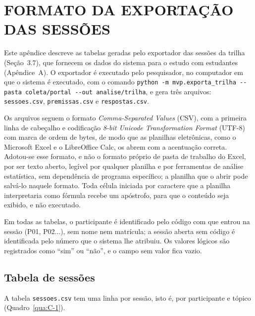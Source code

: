 
\chapter{\texorpdfstring{\mbox{FORMATO} \mbox{DA} \mbox{EXPORTAÇÃO} \mbox{DAS} \mbox{SESSÕES}}{FORMATO DA EXPORTAÇÃO DAS SESSÕES}}\label{cap:C}

Este apêndice descreve as tabelas geradas pelo exportador das sessões da trilha (Seção~3.7), que fornecem os dados do sistema para o estudo com estudantes (Apêndice~A). O exportador é executado pelo pesquisador, no computador em que o sistema é executado, com o comando \texttt{python -{}m mvp.\allowbreak{}exporta\_\allowbreak{}trilha -{}-{}pasta coleta/\allowbreak{}portal -{}-{}out analise/\allowbreak{}trilha}, e gera três arquivos: \texttt{sessoes.csv}, \texttt{premissas.csv} e \texttt{respostas.csv}.

Os arquivos seguem o formato \textit{Comma-Separated Values} (CSV), com a primeira linha de cabeçalho e codificação \textit{8-bit Unicode Transformation Format} (UTF-8) com marca de ordem de bytes, de modo que as planilhas eletrônicas, como o Microsoft Excel e o LibreOffice Calc, os abrem com a acentuação correta. Adotou-se esse formato, e não o formato próprio de pasta de trabalho do Excel, por ser texto aberto, legível por qualquer planilha e por ferramentas de análise estatística, sem dependência de programa específico; a planilha que o abrir pode salvá-lo naquele formato. Toda célula iniciada por caractere que a planilha interpretaria como fórmula recebe um apóstrofo, para que o conteúdo seja exibido, e não executado.

Em todas as tabelas, o participante é identificado pelo código com que entrou na sessão (P01, P02...), sem nome nem matrícula; a sessão aberta sem código é identificada pelo número que o sistema lhe atribuiu. Os valores lógicos são registrados como ``sim'' ou ``não'', e o campo sem valor fica vazio.

\section{Tabela de sessões}

A tabela \texttt{sessoes.csv} tem uma linha por sessão, isto é, por participante e tópico (Quadro~\ref{qua:C-1}).

